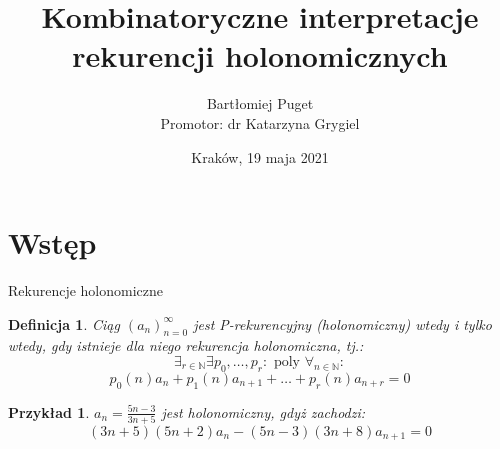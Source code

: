 \documentclass[final]{beamer}
\title{Kombinatoryczne interpretacje rekurencji holonomicznych}
\author[Bartłomiej Puget (TCS UJ)]{Bartłomiej Puget\\Promotor: dr Katarzyna Grygiel}
\institute{Theoretical Computer Science\\Jagiellonian University}
\date{Kraków, 19 maja 2021}
\theoremstyle{bluetheorem}
\theoremstyle{bluetheorem}
\newtheorem{mydefinition}[mytheorem]{Definicja}
\theoremstyle{greentheorem}
\newtheorem{myexample}[mytheorem]{Przykład}
\begin{document}
\maketitle

\section{Wstęp}

\begin{frame}{Rekurencje holonomiczne}
    \begin{mydefinition}
        Ciąg \((a_n)_{n=0}^\infty\) jest P-rekurencyjny (holonomiczny) wtedy i tylko wtedy, gdy istnieje dla niego rekurencja holonomiczna, tj.:
        \[\exists_{r \in \mathbb{N}} \exists {p_0, \ldots, p_r : \text{ poly }}\forall_{n \in \mathbb{N}}:\]
        \[p_0(n) a_n + p_1(n) a_{n + 1} + \ldots + p_r(n) a_{n + r} = 0\]
    \end{mydefinition}

    \begin{myexample}
        \(a_n = \frac{5 n - 3}{3 n + 5}\) jest holonomiczny, gdyż zachodzi:
        \[(3n + 5) (5n + 2) a_n - (5n - 3)(3n + 8) a_{n + 1} = 0\]
    \end{myexample}
\end{frame}

\end{document}
